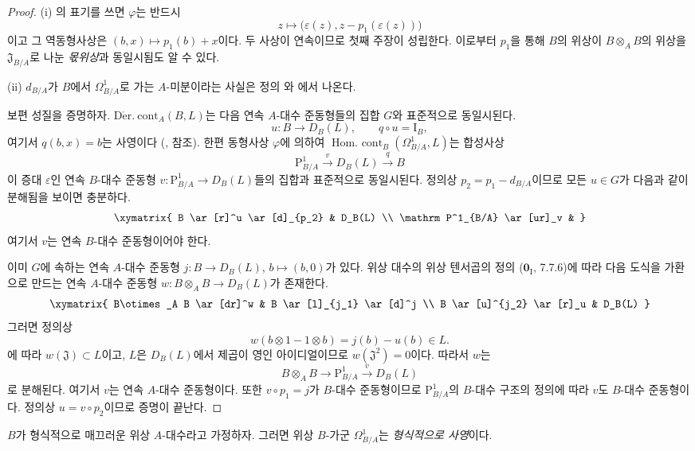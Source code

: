 \begin{proof}
(i) 의 표기를 쓰면 $\varphi$는 반드시
\[
  z\longmapsto
  \bigl(\varepsilon(z),z-p_1(\varepsilon(z))\bigr)
\]
이고 그 역동형사상은 $(b,x)\mapsto p_1(b)+x$이다. 두 사상이
연속이므로 첫째 주장이 성립한다. 이로부터 $p_1$을 통해 $B$의
위상이 $B\otimes_A B$의 위상을 $\mathfrak J_{B/A}$로 나눈
\emph{몫위상}과 동일시됨도 알 수 있다.

(ii) $d_{B/A}$가 $B$에서 $\Omega^1_{B/A}$로 가는 $A$-미분이라는
사실은 정의 와 에서 나온다.

보편 성질을 증명하자.
$\operatorname{D\acute{e}r.\ cont}_A(B,L)$는 다음 연속
$A$-대수 준동형들의 집합 $G$와 표준적으로 동일시된다.
\[
  u:B\to D_B(L),\qquad q\circ u=\mathrm I_B,
\]
여기서 $q(b,x)=b$는 사영이다
(,  참조). 한편 동형사상
$\varphi$에 의하여
$\operatorname{Hom.\ cont}_B(\Omega^1_{B/A},L)$는 합성사상
\[
  \mathrm P^1_{B/A}\xrightarrow{v}D_B(L)\xrightarrow{q}B
\]
이 증대 $\varepsilon$인 연속 $B$-대수 준동형
$v:\mathrm P^1_{B/A}\to D_B(L)$들의 집합과 표준적으로 동일시된다.
정의상 $p_2=p_1-d_{B/A}$이므로 모든 $u\in G$가 다음과 같이
분해됨을 보이면 충분하다.
\[
\xymatrix{
  B \ar[r]^u \ar[d]_{p_2} & D_B(L) \\
  \mathrm P^1_{B/A} \ar[ur]_v &
}
\]
여기서 $v$는 연속 $B$-대수 준동형이어야 한다.

이미 $G$에 속하는 연속 $A$-대수 준동형
$j:B\to D_B(L)$, $b\mapsto(b,0)$가 있다. 위상 대수의 위상
텐서곱의 정의 ($\mathbf 0_{\mathrm I}$, 7.7.6)에 따라 다음 도식을
가환으로 만드는 연속 $A$-대수 준동형
$w:B\otimes_A B\to D_B(L)$가 존재한다.
\[
\xymatrix{
  B\otimes_A B \ar[dr]^w & B \ar[l]_{j_1} \ar[d]^j \\
  B \ar[u]^{j_2} \ar[r]_u & D_B(L)
}
\]
그러면 정의상
\[
  w(b\otimes1-1\otimes b)=j(b)-u(b)\in L.
\]
에 따라 $w(\mathfrak J)\subset L$이고, $L$은
$D_B(L)$에서 제곱이 영인 아이디얼이므로 $w(\mathfrak J^2)=0$이다.
따라서 $w$는
\[
  B\otimes_A B\longrightarrow\mathrm P^1_{B/A}
  \xrightarrow{v}D_B(L)
\]
로 분해된다. 여기서 $v$는 연속 $A$-대수 준동형이다. 또한
$v\circ p_1=j$가 $B$-대수 준동형이므로
$\mathrm P^1_{B/A}$의 $B$-대수 구조의 정의에 따라 $v$도
$B$-대수 준동형이다. 정의상 $u=v\circ p_2$이므로 증명이 끝난다.
\end{proof}

\begin{theorem}[20.4.9]
\label{0.20.4.9-ko}
$B$가 형식적으로 매끄러운 위상 $A$-대수라고 가정하자. 그러면 위상
$B$-가군 $\Omega^1_{B/A}$는 \emph{형식적으로 사영}이다.
\end{theorem}

